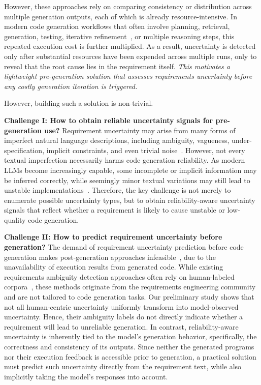 However, these approaches rely on comparing consistency or distribution across multiple generation outputs, each of which is already resource-intensive. In modern code generation workflows that often involve planning, retrieval, generation, testing, iterative refinement~\cite{islam2024mapcoder,zhang2023repocoder, 11334685, zhao2025projectgen}, or multiple reasoning steps, this repeated execution cost is further multiplied. As a result, uncertainty is detected only after substantial resources have been expended across multiple runs, only to reveal that the root cause lies in the requirement itself. \emph{This motivates a lightweight pre-generation solution that assesses requirements uncertainty before any costly generation iteration is triggered.}

However, building such a solution is non-trivial.

\noindent \textbf{Challenge I: How to obtain reliable uncertainty signals for pre-generation use? }
Requirement uncertainty may arise from many forms of imperfect natural language descriptions, including ambiguity, vagueness, under-specification, implicit constraints, and even trivial noise~\cite{abdeahad2026accurate,ezzini2022anaphoric,yang2026assessingimpactrequirementambiguity}. However, not every textual imperfection necessarily harms code generation reliability. As modern LLMs become increasingly capable, some incomplete or implicit information may be inferred correctly, while seemingly minor textual variations may still lead to unstable implementations~\cite{chen2026nlperturbator}. Therefore, the key challenge is not merely to enumerate possible uncertainty types, but to obtain reliability-aware uncertainty signals that reflect whether a requirement is likely to cause unstable or low-quality code generation.

\noindent\textbf{Challenge II: How to predict requirement uncertainty before generation?} The demand of requirement uncertainty prediction before code generation makes post-generation approaches infeasible~\cite{mu2024clarifygpt, jia2025specfix}, due to the unavailability of execution results from generated code. While existing requirements ambiguity detection approaches often rely on human-labeled corpora~\cite{abdeahad2026accurate,ezzini2022anaphoric}, these methods originate from the requirements engineering community and are not tailored to code generation tasks. Our preliminary study shows that not all human-centric uncertainty uniformly transform into model-observed uncertainty.  Hence, their ambiguity labels do not directly indicate whether a requirement will lead to unreliable generation. In contrast, reliability-aware uncertainty is inherently tied to the model's generation behavior, specifically, the correctness and consistency of its outputs. Since neither the generated programs nor their execution feedback is accessible prior to generation, a practical solution must predict such uncertainty directly from the requirement text, while also implicitly taking the model's responses into account.

